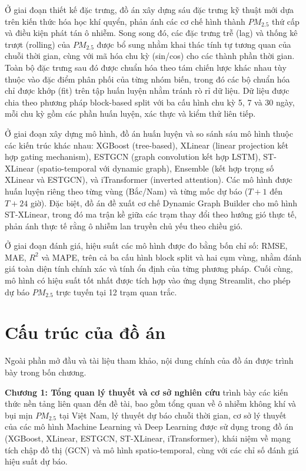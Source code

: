 Ở giai đoạn thiết kế đặc trưng, đồ án xây dựng sáu đặc trưng kỹ thuật mới dựa trên kiến thức hóa học khí quyển, phản ánh các cơ chế hình thành $PM_{2.5}$ thứ cấp và điều kiện phát tán ô nhiễm. Song song đó, các đặc trưng trễ (lag) và thống kê trượt (rolling) của $PM_{2.5}$ được bổ sung nhằm khai thác tính tự tương quan của chuỗi thời gian, cùng với mã hóa chu kỳ (sin/cos) cho các thành phần thời gian. Toàn bộ đặc trưng sau đó được chuẩn hóa theo tám chiến lược khác nhau tùy thuộc vào đặc điểm phân phối của từng nhóm biến, trong đó các bộ chuẩn hóa chỉ được khớp (fit) trên tập huấn luyện nhằm tránh rò rỉ dữ liệu. Dữ liệu được chia theo phương pháp block-based split với ba cấu hình chu kỳ 5, 7 và 30 ngày, mỗi chu kỳ gồm các phần huấn luyện, xác thực và kiểm thử liên tiếp.

Ở giai đoạn xây dựng mô hình, đồ án huấn luyện và so sánh sáu mô hình thuộc các kiến trúc khác nhau: XGBoost (tree-based), XLinear (linear projection kết hợp gating mechanism), ESTGCN (graph convolution kết hợp LSTM), ST-XLinear (spatio-temporal với dynamic graph), Ensemble (kết hợp trọng số XLinear và ESTGCN), và iTransformer (inverted attention). Các mô hình được huấn luyện riêng theo từng vùng (Bắc/Nam) và từng mốc dự báo ($T+1$ đến $T+24$ giờ). Đặc biệt, đồ án đề xuất cơ chế Dynamic Graph Builder cho mô hình ST-XLinear, trong đó ma trận kề giữa các trạm thay đổi theo hướng gió thực tế, phản ánh thực tế rằng ô nhiễm lan truyền chủ yếu theo chiều gió.

Ở giai đoạn đánh giá, hiệu suất các mô hình được đo bằng bốn chỉ số: RMSE, MAE, $R^2$ và MAPE, trên cả ba cấu hình block split và hai cụm vùng, nhằm đánh giá toàn diện tính chính xác và tính ổn định của từng phương pháp. Cuối cùng, mô hình có hiệu suất tốt nhất được tích hợp vào ứng dụng Streamlit, cho phép dự báo $PM_{2.5}$ trực tuyến tại 12 trạm quan trắc.

\section{Cấu trúc của đồ án}

Ngoài phần mở đầu và tài liệu tham khảo, nội dung chính của đồ án được trình bày trong bốn chương.

\textbf{Chương 1: Tổng quan lý thuyết và cơ sở nghiên cứu} trình bày các kiến thức nền tảng liên quan đến đề tài, bao gồm tổng quan về ô nhiễm không khí và bụi mịn $PM_{2.5}$ tại Việt Nam, lý thuyết dự báo chuỗi thời gian, cơ sở lý thuyết của các mô hình Machine Learning và Deep Learning được sử dụng trong đồ án (XGBoost, XLinear, ESTGCN, ST-XLinear, iTransformer), khái niệm về mạng tích chập đồ thị (GCN) và mô hình spatio-temporal, cùng với các chỉ số đánh giá hiệu suất dự báo.

